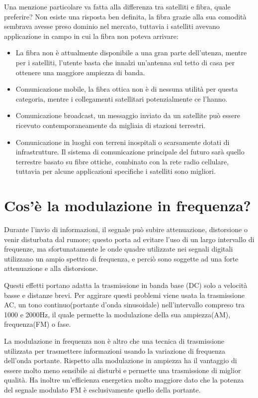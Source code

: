 Una menzione particolare va fatta alla differenza tra satelliti e fibra, quale preferire? 
Non esiste una risposta ben definita, la fibra grazie alla sua comodità sembrava avesse preso dominio nel mercato, tuttavia i satelliti avevano applicazione in campo in cui la fibra non poteva arrivare:
\begin{itemize}
\item	La fibra non è attualmente disponibile a una gran parte dell’utenza, mentre per i satelliti, l’utente basta che innalzi un’antenna sul tetto di casa per ottenere una maggiore ampiezza di banda.
\item	Comunicazione mobile, la fibra ottica non è di nessuna utilità per questa categoria, mentre i collegamenti satellitari potenzialmente ce l’hanno.
\item	Comunicazione broadcast, un messaggio inviato da un satellite può essere ricevuto contemporaneamente da migliaia di stazioni terrestri.
\item	Comunicazione in luoghi con terreni inospitali o scarsamente dotati di infrastrutture.
Il sistema di comunicazione principale del futuro sarà quello terrestre basato su fibre ottiche, combinato con la rete radio cellulare, tuttavia per alcune applicazioni specifiche i satelliti sono migliori.
\end{itemize}

\section{Cos’è la modulazione in frequenza?}
Durante l’invio di informazioni, il segnale può subire attenuazione, distorsione o venir disturbata dal rumore; questo porta ad evitare l’uso di un largo intervallo di frequenze, ma sfortunatamente le onde quadre utilizzate nei segnali digitali utilizzano un ampio spettro di frequenza, e perciò sono soggette ad una forte attenuazione e alla distorsione.

Questi effetti portano adatta la trasmissione in banda base (DC) solo a velocità basse e distanze brevi.
Per aggirare questi problemi viene usata la trasmissione AC, un tono continuo(portante d’onda sinusoidale) nell’intervallo compreso tra 1000 e 2000Hz, il quale permette la modulazione della sua ampiezza(AM), frequenza(FM) o fase.

 
La modulazione in frequenza non è altro che una tecnica di trasmissione utilizzata per trasmettere informazioni usando la variazione di frequenza dell’onda portante. Rispetto alla modulazione in ampiezza ha il vantaggio di essere molto meno sensibile ai disturbi e permette una trasmissione di miglior qualità. Ha inoltre un’efficienza energetica molto maggiore dato che la potenza del segnale modulato FM è esclusivamente quello della portante.

